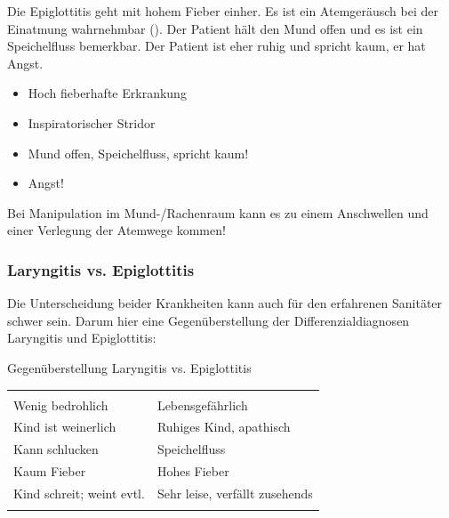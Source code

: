 \TextSlide{\TxSymptome}
{%
Die Epiglottitis geht mit hohem Fieber einher. Es ist ein
Atemgeräusch bei der Einatmung wahrnehmbar
(). Der Patient hält den Mund
offen und es ist ein Speichelfluss bemerkbar. Der Patient
ist eher ruhig und spricht kaum, er hat Angst.
}{%
\begin{itemize}
    \item Hoch fieberhafte Erkrankung
    \item Inspiratorischer Stridor
    \item Mund offen, Speichelfluss, spricht kaum!
    \item Angst!
\end{itemize}
}{}{}{}

\begin{Danger}
  \item Bei Manipulation im Mund-/Rachenraum kann es zu einem Anschwellen und einer Verlegung der Atemwege kommen!
\end{Danger}



\subsubsection{ Laryngitis vs. Epiglottitis}
 
Die Unterscheidung beider Krankheiten kann auch für den
erfahrenen Sanitäter schwer sein. Darum hier eine
Gegenüberstellung der Differenzialdiagnosen Laryngitis
und Epiglottitis:


\Table
{Gegenüberstellung Laryngitis vs. Epiglottitis}%
{}%
{}%
{}%
{}%
{%
\begin{tabulary}{\linewidth}{LL}
\toprule\addlinespace
\noindent{}
&
\noindent{}
\\\addlinespace\midrule\addlinespace
Wenig bedrohlich
&
Lebensgefährlich
\\\addlinespace
Kind ist weinerlich
&
Ruhiges Kind, apathisch
\\\addlinespace
Kann schlucken
&
Speichelfluss
\\\addlinespace
Kaum Fieber
&
Hohes Fieber
\\\addlinespace
Kind schreit; weint evtl.
&
Sehr leise, verfällt zusehends
\\\addlinespace\bottomrule
\end{tabulary}
}%
{}%

